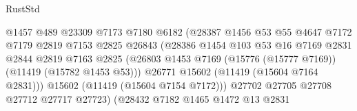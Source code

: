 \begin{lexlean}{RustStd}
\begin{coremodule}
                                          @1457
                                          @489
                                          @23309
                                          @7173
                                          @7180
                                          @6182
                                          (@28387
                                            @1456
                                            @53
                                            @55
                                            @4647
                                            @7172
                                            @7179
                                            @2819
                                            @7153
                                            @2825
                                            @26843
                                            (@28386
                                              @1454
                                              @103
                                              @53
                                              @16
                                              @7169
                                              @2831
                                              @2844
                                              @2819
                                              @7163
                                              @2825
                                              (@26803
                                                @1453
                                                @7169
                                                (@15776 (@15777 @7169))
                                                (@11419 (@15782 @1453 @53)))
                                              @26771
                                              @15602
                                              (@11419 (@15604 @7164 @2831)))
                                            @15602
                                            (@11419 (@15604 @7154 @7172)))
                                          @27702
                                          @27705
                                          @27708
                                          @27712
                                          @27717
                                          @27723)
                                        (@28432
                                          @7182
                                          @1465
                                          @1472
                                          @13
                                          @2831

\end{coremodule}
\end{lexlean}
